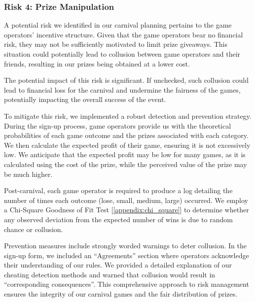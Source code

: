 \subsubsection{Risk 4: Prize Manipulation}

A potential risk we identified in our carnival planning pertains to the game operators' incentive structure. Given that the game operators bear no financial risk, they may not be sufficiently motivated to limit prize giveaways. This situation could potentially lead to collusion between game operators and their friends, resulting in our prizes being obtained at a lower cost.

The potential impact of this risk is significant. If unchecked, such collusion could lead to financial loss for the carnival and undermine the fairness of the games, potentially impacting the overall success of the event.

To mitigate this risk, we implemented a robust detection and prevention strategy. During the sign-up process, game operators provide us with the theoretical probabilities of each game outcome and the prizes associated with each category. We then calculate the expected profit of their game, ensuring it is not excessively low. We anticipate that the expected profit may be low for many games, as it is calculated using the cost of the prize, while the perceived value of the prize may be much higher.

Post-carnival, each game operator is required to produce a log detailing the number of times each outcome (lose, small, medium, large) occurred. We employ a Chi-Square Goodness of Fit Test [\ref{appendix:chi_square}] to determine whether any observed deviation from the expected number of wins is due to random chance or collusion.

Prevention measures include strongly worded warnings to deter collusion. In the sign-up form, we included an “Agreements” section where operators acknowledge their understanding of our rules. We provided a detailed explanation of our cheating detection methods and warned that collusion would result in “corresponding consequences”. This comprehensive approach to risk management ensures the integrity of our carnival games and the fair distribution of prizes.
